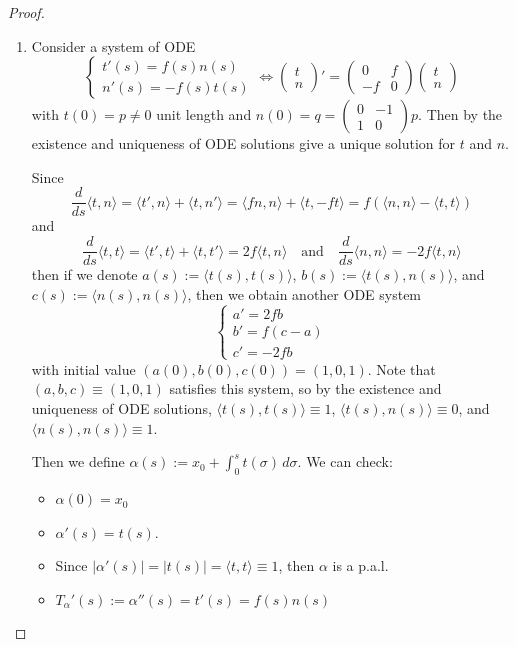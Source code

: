 \begin{proof} \begin{enumerate}
    \item Consider a system of ODE
\[
\begin{cases}
t'(s) = f(s)n(s)\\
n'(s) = -f(s)t(s)
\end{cases}
\iff
\begin{pmatrix}t\\n\end{pmatrix}' = \begin{pmatrix}0 & f\\-f & 0\end{pmatrix}\begin{pmatrix}t\\n\end{pmatrix}
\]
with $t(0) = p\neq 0$ unit length and $n(0) = q = \begin{pmatrix}0 & -1\\1 & 0\end{pmatrix}p$. Then by the existence and uniqueness of ODE solutions give a unique solution for $t$ and $n$.

\noindent Since
\[
\frac{d}{ds}\langle t, n\rangle = \langle t', n\rangle + \langle t, n'\rangle = \langle fn, n\rangle + \langle t, -ft\rangle = f(\langle n, n\rangle - \langle t, t\rangle)
\]
and
\[
\frac{d}{ds}\langle t, t\rangle = \langle t', t\rangle + \langle t, t'\rangle = 2f\langle t, n\rangle \quad\text{and}\quad \frac{d}{ds}\langle n, n\rangle = -2f\langle t, n\rangle
\]
then if we denote $a(s) := \langle t(s), t(s)\rangle$, $b(s) := \langle t(s), n(s)\rangle$, and $c(s) := \langle n(s), n(s)\rangle$, then we obtain another ODE system
\[
\begin{cases}
a' = 2fb\\
b' = f(c - a)\\
c' = -2fb
\end{cases}
\]
with initial value $(a(0), b(0), c(0)) = (1, 0, 1)$. Note that $(a, b, c)\equiv(1, 0, 1)$ satisfies this system, so by the existence and uniqueness of ODE solutions, $\langle t(s), t(s)\rangle\equiv 1$, $\langle t(s), n(s)\rangle\equiv 0$, and $\langle n(s), n(s)\rangle\equiv 1$.

\noindent Then we define $\alpha(s) := x_0 + \int_0^s t(\sigma)\,d\sigma$. We can check:
\begin{itemize}
\item $\alpha(0) = x_0$
\item $\alpha'(s) = t(s)$.
\item Since $|\alpha'(s)| = |t(s)| = \langle t, t\rangle\equiv 1$, then $\alpha$ is a p.a.l.
\item $T_\alpha'(s) := \alpha''(s) = t'(s) = f(s)n(s)$
\end{itemize}


\end{enumerate}
\end{proof}

